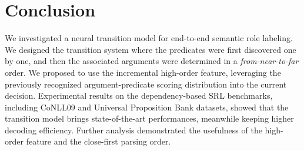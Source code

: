 \documentclass[letterpaper]{article} \usepackage{aaai21}  \usepackage{times}  \usepackage{helvet} \usepackage{courier}  \usepackage[hyphens]{url}  \usepackage{graphicx} \urlstyle{rm} \def\UrlFont{\rm}  \usepackage{natbib}  \usepackage{caption}
\begin{document}
\begin{CJK}{UTF8}{gbsn}
\begin{table}[!t]
\begin{center}
\end{center}
\caption{
Results for argument role violation.
}
  \label{Role Violation}
\end{table}











\section{Conclusion}

We investigated a neural transition model for end-to-end semantic role labeling.
We designed the transition system where the predicates were first discovered one by one, and then the associated arguments were determined in a \emph{from-near-to-far} order.
We proposed to use the incremental high-order feature, leveraging the previously recognized argument-predicate scoring distribution into the current decision.
Experimental results on the dependency-based SRL benchmarks, including CoNLL09 and Universal Proposition Bank datasets, showed that the transition model brings state-of-the-art performances, meanwhile keeping higher decoding efficiency.
Further analysis demonstrated the usefulness of the high-order feature and the close-first parsing order.













\end{CJK}
\end{document}
